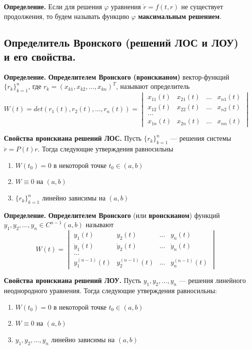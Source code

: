 \documentclass{article}
\begin{document}
\noindent \textbf{Определение.} Если для решения $\varphi$ уравнения $\dot{r} = f(t,r)$ не существует продолжения, то будем называть функцию $\varphi$ \textbf{максимальным решением}.

\subsection{Определитель Вронского (решений ЛОС и ЛОУ) и его свойства.}
\textbf{Определение.} \textbf{Определителем Вронского (вронскианом)} вектор-функций $\{r_k\}_{k=1}^n$, где $r_k=(x_{k1}, x_{k2}, \ldots, x_{kn})^T$, называют определитель
\begin{equation*}
    W(t) = det(r_1(t),r_2(t),\ldots, r_n(t)) = \begin{vmatrix}
    x_{11}(t) & x_{21}(t) & \ldots & x_{n1}(t)\\
    x_{12}(t) & x_{22}(t) & \ldots & x_{n2}(t)\\
    \ldots\\
    x_{1n}(t) & x_{2n}(t) & \ldots & x_{nn}(t)
    \end{vmatrix}
\end{equation*}

\noindent \textbf{Свойства вронскиана решений ЛОС.} Пусть $\{r_k\}_{k=1}^n$ --- решения системы $\dot{r} = P(t)r$. Тогда следующие утверждения равносильны
\begin{enumerate}
    \item $W(t_0) = 0$ в некоторой точке $t_0 \in (a,b)$
    \item $W \equiv 0$ на $(a,b)$
    \item $\{r_k\}_{k=1}^n$ линейно зависимы на $(a,b)$
\end{enumerate}

\noindent \textbf{Определение.} \textbf{Определителем Вронского} (или \textbf{вронскианом}) функций $y_1, y_2, \ldots, y_n \in C^{n-1}(a,b)$ называют
\begin{equation*}
    W(t) = \begin{vmatrix}
    y_1(t) & y_2(t) & \ldots & y_n(t)\\
    \dot{y}_1(t) & \dot{y}_2(t) & \ldots & \dot{y}_n(t)\\
    \ldots\\
    y_1^{(n-1)}(t) & y_2^{(n-1)}(t) & \ldots & y_n^{(n-1)}(t)
    \end{vmatrix}
\end{equation*}

\noindent \textbf{Свойства вронскиана решений ЛОУ.} Пусть $y_1, y_2, \ldots, y_n$ --- решения линейного неоднородного уравнения. Тогда следующие утверждения равносильны:
\begin{enumerate}
    \item $W(t_0) = 0$ в некоторой точке $t_0 \in (a,b)$
    \item $W \equiv 0$ на $(a,b)$
    \item $y_1, y_2, \ldots, y_n$ линейно зависимы на $(a,b)$
\end{enumerate}
\end{document}

